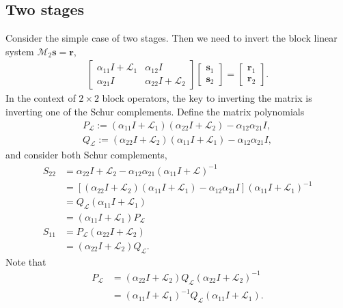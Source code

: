 \documentclass[a4paper,10pt]{article}
\begin{document}
\subsection{Two stages}

Consider the simple case of two stages. Then we need to invert the block linear system $\mathcal{M}_2\mathbf{s} = \mathbf{r}$,
%
\begin{align}\label{eq:Mnt}
\begin{bmatrix} \alpha_{11} I + \mathcal{L}_1 & \alpha_{12}I \\ \alpha_{21}I & \alpha_{22}I + \mathcal{L}_2\end{bmatrix}
	\begin{bmatrix}\mathbf{s}_1 \\ \mathbf{s}_2 \end{bmatrix} = 
	\begin{bmatrix}\mathbf{r}_1 \\ \mathbf{r}_2 \end{bmatrix}.
\end{align}
%
In the context of $2\times 2$ block operators, the key to inverting the matrix is inverting one of
the Schur complements. Define the matrix polynomials
%
\begin{align*}
P_{\mathcal{L}} := (\alpha_{11}I + \mathcal{L}_1)(\alpha_{22}I + \mathcal{L}_2) - \alpha_{12}\alpha_{21}I, \\
Q_{\mathcal{L}} := (\alpha_{22}I + \mathcal{L}_2)(\alpha_{11}I + \mathcal{L}_1) - \alpha_{12}\alpha_{21}I,
\end{align*}
%
and consider both Schur complements,
%
\begin{align*}
S_{22} & = \alpha_{22} I + \mathcal{L}_2 - \alpha_{12}\alpha_{21}(\alpha_{11} I + \mathcal{L} )^{-1} \\
& = \left[ ( \alpha_{22} I + \mathcal{L}_2)(\alpha_{11} I + \mathcal{L}_1) - \alpha_{12}\alpha_{21}I \right]
	(\alpha_{11} I + \mathcal{L}_1 )^{-1} \\
& = Q_{\mathcal{L}}(\alpha_{11} I + \mathcal{L}_1 ) \\
& = (\alpha_{11} I + \mathcal{L}_1 )P_{\mathcal{L}} \\
S_{11} & = P_{\mathcal{L}}(\alpha_{22} I + \mathcal{L}_2 ) \\
& = (\alpha_{22} I + \mathcal{L}_2 )Q_{\mathcal{L}}.
\end{align*}
%
Note that 
%
\begin{align*}
P_{\mathcal{L}} & = (\alpha_{22} I + \mathcal{L}_2 )Q_{\mathcal{L}}(\alpha_{22} I + \mathcal{L}_2 )^{-1} \\
& = (\alpha_{11} I + \mathcal{L}_1 )^{-1} Q_{\mathcal{L}}(\alpha_{11} I + \mathcal{L}_1 ).
\end{align*}
%
\end{document}
